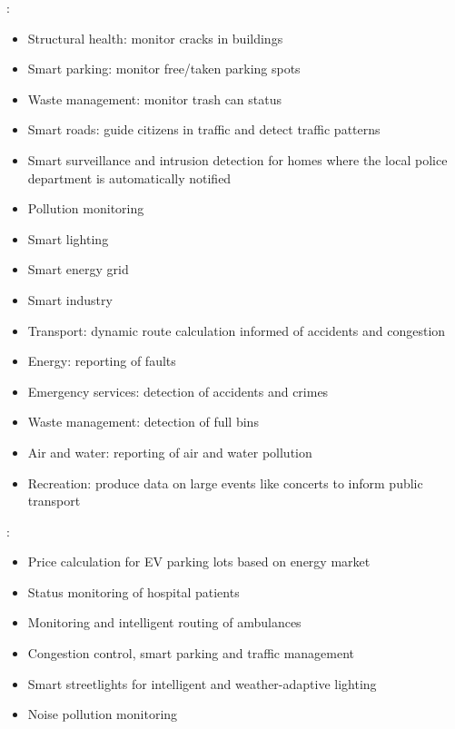 \documentclass[parskip=half]{scrartcl}
\begin{document}
\cite[p.~8~ff.]{Ahmed.2018}:
\begin{itemize}
	\item Structural health: monitor cracks in buildings
	\item Smart parking: monitor free/taken parking spots
	\item Waste management: monitor trash can status
	\item Smart roads: guide citizens in traffic and detect traffic patterns
	\item Smart surveillance and intrusion detection for homes where the local police department is automatically notified
	\item Pollution monitoring
	\item Smart lighting
	\item Smart energy grid
	\item Smart industry
\end{itemize}

\cite[p.~7~f.]{Petrolo.2017}
\begin{itemize}
	\item Transport: dynamic route calculation informed of accidents and congestion
	\item Energy: reporting of faults
	\item Emergency services: detection of accidents and crimes
	\item Waste management: detection of full bins
	\item Air and water: reporting of air and water pollution
	\item Recreation: produce data on large events like concerts to inform public transport
\end{itemize}

\cite[p.~8~ff.]{Alavi.2018}:
\begin{itemize}
	\item Price calculation for EV parking lots based on energy market
	\item Status monitoring of hospital patients
	\item Monitoring and intelligent routing of ambulances
	\item Congestion control, smart parking and traffic management
	\item Smart streetlights for intelligent and weather-adaptive lighting
	\item Noise pollution monitoring
\end{itemize}
\end{document}
